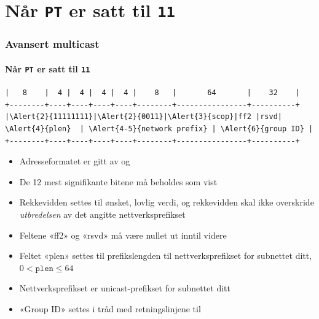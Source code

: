 \section{Når \texttt{PT} er satt til \texttt{11}}
\begin{frame}[fragile]%
  \frametitle{Avansert multicast}
  \framesubtitle{Når \texttt{PT} er satt til \texttt{11}}
\begin{Verbatim}[commandchars=\\\{\},fontsize=\tiny]
|   8    |  4 |  4 |  4 |  4 |    8   |       64       |    32    |
+--------+----+----+----+----+--------+----------------+----------+
|\Alert{2}{11111111}|\Alert{2}{0011}|\Alert{3}{scop}|ff2 |rsvd|  \Alert{4}{plen}  | \Alert{4-5}{network prefix} | \Alert{6}{group ID} |
+--------+----+----+----+----+--------+----------------+----------+
\end{Verbatim}
  \begin{itemize}%
  \item Adresseformatet er gitt av  og 
  \item \alert<2>{De 12 mest signifikante bitene} må beholdes som vist
  \item \alert<3>{Rekkevidden} settes til ønsket, lovlig verdi, og
    rekkevidden skal ikke overskride \textit{utbredelsen\/} av det
    angitte nettverksprefikset
  \item Feltene «ff2» og «rsvd» må være nullet ut inntil videre
  \item Feltet «plen» settes til \alert<4>{prefikslengden til
      nettverksprefikset for subnettet ditt}, \(0<\mathtt{plen}\le64\)
  \item \alert<5>{Nettverksprefikset} er unicast-prefikset for
    subnettet ditt
  \item \alert<6>{«Group ID»} settes i tråd med retningslinjene til 
  \end{itemize}
\end{frame}

